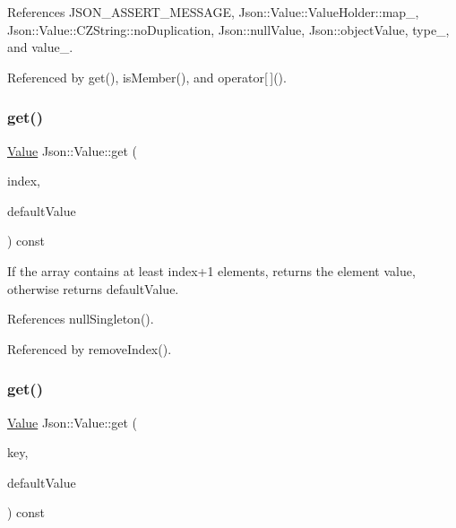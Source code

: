 References J\+S\+O\+N\+\_\+\+A\+S\+S\+E\+R\+T\+\_\+\+M\+E\+S\+S\+A\+GE, Json\+::\+Value\+::\+Value\+Holder\+::map\+\_\+, Json\+::\+Value\+::\+C\+Z\+String\+::no\+Duplication, Json\+::null\+Value, Json\+::object\+Value, type\+\_\+, and value\+\_\+.



Referenced by get(), is\+Member(), and operator\mbox{[}$\,$\mbox{]}().

\mbox{\label{classJson_1_1Value_a034eb7bf85a44fa759bdaa232788ca66_a034eb7bf85a44fa759bdaa232788ca66}} 
\subsubsection{\texorpdfstring{get()}{get()}\hspace{0.1cm}{\footnotesize\ttfamily [1/4]}}
{\footnotesize\ttfamily \hyperlink{classJson_1_1Value}{Value} Json\+::\+Value\+::get (\begin{DoxyParamCaption}\item[{\hyperlink{classJson_1_1Value_a184a91566cccca7b819240f0d5561c7d_a184a91566cccca7b819240f0d5561c7d}{Array\+Index}}]{index,  }\item[{const \hyperlink{classJson_1_1Value}{Value} \&}]{default\+Value }\end{DoxyParamCaption}) const}

If the array contains at least index+1 elements, returns the element value, otherwise returns default\+Value. 

References null\+Singleton().



Referenced by remove\+Index().

\mbox{\label{classJson_1_1Value_a57de86629ed23246f14014fb6c44fa67_a57de86629ed23246f14014fb6c44fa67}} 
\subsubsection{\texorpdfstring{get()}{get()}\hspace{0.1cm}{\footnotesize\ttfamily [2/4]}}
{\footnotesize\ttfamily \hyperlink{classJson_1_1Value}{Value} Json\+::\+Value\+::get (\begin{DoxyParamCaption}\item[{const char $\ast$}]{key,  }\item[{const \hyperlink{classJson_1_1Value}{Value} \&}]{default\+Value }\end{DoxyParamCaption}) const}

